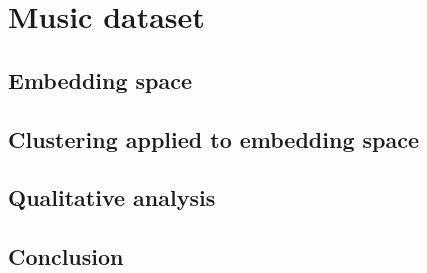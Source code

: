 \section{Music dataset}
\label{sec:Results-Music}

\subsection{Embedding space}

\subsection{Clustering applied to embedding space}

\subsection{Qualitative analysis}

\subsection{Conclusion}

